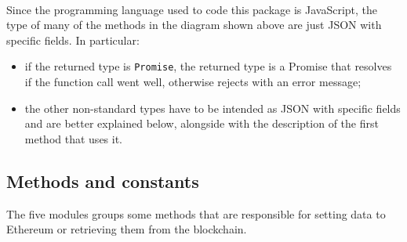 \\Since the programming language used to code this package is JavaScript, the type of many of the methods in the diagram shown above are just JSON with specific fields. In particular:
\begin{itemize}
	\item if the returned type is \texttt{Promise}, the returned type is a Promise that resolves if the function call went well, otherwise rejects with an error message;
	\item the other non-standard types have to be intended as JSON with specific fields and are better explained below, alongside with the description of the first method that uses it.
\end{itemize}
\subsection{Methods and constants}

The five modules groups some methods that are responsible for setting data to Ethereum or retrieving them from the blockchain.

